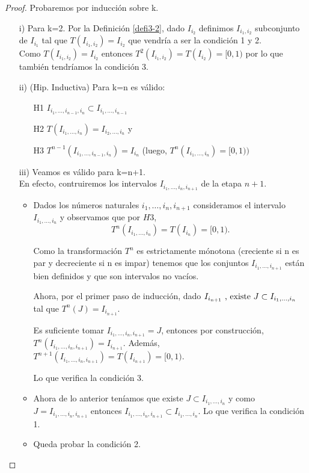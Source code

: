 \begin{proof}
Probaremos por inducción sobre k. 
\begin{enumerate}
    \item[i)] Para k=2. Por la Definición \ref{defi3-2}, dado $I_{i_{2}}$ definimos $I_{i_{1},i_{2}}$ subconjunto de $I_{i_{1}}$ tal que $T(I_{i_{1},i_{2}})=I_{i_{2}}$ que vendría a ser la condición 1 y 2.
    \\
    Como $T(I_{i_{1},i_{2}})=I_{i_{2}}$ entonces $T^{2}(I_{i_{1},i_{2}})=T(I_{i_{2}})=[0,1)$ por lo que también tendríamos la condición 3.
    \item[ii)] (Hip. Inductiva) Para k=n es válido:
    \begin{itemize}
    \item[H1] $I_{i_{1},\ldots,i_{n-1},i_{n}}\subset I_{i_{1},\ldots,i_{n-1}}$
    \item[H2]
    $T(I_{i_{1},\ldots,i_{n}})=I_{i_{2},\ldots,i_{n}}$ y
    \item[H3] $T^{n-1}(I_{i_{1},\ldots,i_{n-1},i_{n}})=I_{i_{n}}$ (luego, $T^{n}(I_{i_{1},\ldots,i_{n}})=[0,1))$
    \end{itemize}
    \item[iii)]Veamos es válido para k=n+1. 
    \\
    En efecto, contruiremos los intervalos $I_{i_{1},\ldots,i_{n},i_{n+1}}$ de la etapa $n+1$. 
    \begin{itemize}
        \item Dados los números naturales $i_{1},\ldots,i_{n},i_{n+1}$ consideramos el intervalo $I_{i_{1},\ldots,i_{n}}$ y observamos que por $H3$,
        $$
        T^{n}(I_{i_{1},\ldots,i_{n}})=T(I_{i_{n}})=[0,1).
        $$
        
        Como la transformación $T^{n}$ es estrictamente mónotona (creciente si n es par y decreciente si n es impar) tenemos que los conjuntos $I_{i_{1},\ldots,i_{n+1}}$ están bien definidos y que son intervalos no vacíos.
        
        Ahora, por el primer paso de inducción, dado $I_{i_{n+1}} \text{ , existe } \\
        J\subset I_{i_{1},\ldots,i_{n}}$ tal que $T^{n}(J)=I_{i_{n+1}}$.
        
        Es suficiente tomar $I_{i_{1},\ldots,i_{n},i_{n+1}}=J$, entonces por construcción, $T^{n}(I_{i_{1},\ldots,i_{n},i_{n+1}})=I_{i_{n+1}}.$
        Además, $T^{n+1}(I_{i_{1},\ldots,i_{n},i_{n+1}})=T(I_{i_{n+1}})=[0,1)$.
        
        Lo que verifica la condición 3.
        \item Ahora de lo anterior teníamos que existe $J \subset I_{i_{1},\ldots,i_{n}}$ y como $J=I_{i_{1},\ldots,i_{n},i_{n+1}}$ entonces $I_{i_{1},\ldots,i_{n},i_{n+1}}\subset I_{i_{1},\ldots,i_{n}}$.
        Lo que verifica la condición 1.
        \item Queda probar la condición 2.
        

\end{itemize}
\end{enumerate}
\end{proof}
